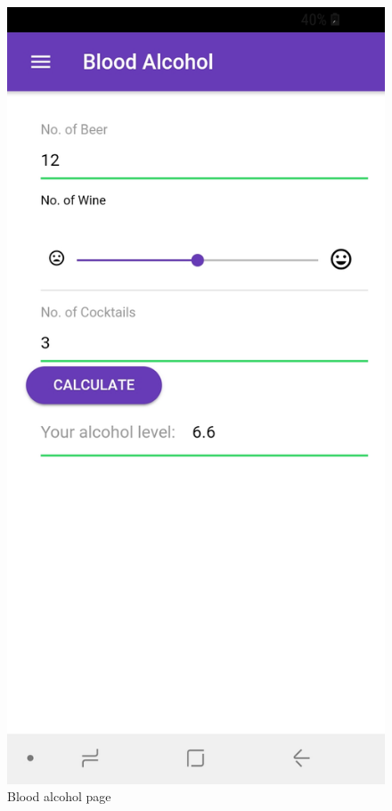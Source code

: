 \documentclass[12pt]{article}
\begin{document}
\begin{figure}[H]
  \includegraphics[width=\linewidth]{figures/Calc_alc.jpg}
  \caption{Blood alcohol page}\label{fig:awesome_image4}

\end{figure}
\end{document}
